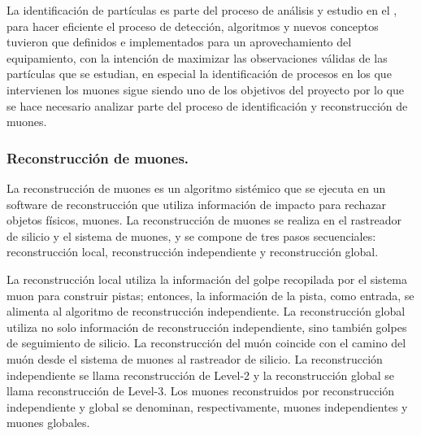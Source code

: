 La identificación de partículas es parte del proceso de análisis y estudio en el \LHC, para hacer eficiente el proceso de detección, algoritmos y nuevos conceptos tuvieron que definidos e implementados para un aprovechamiento del equipamiento, con la intención de maximizar las observaciones válidas de las partículas que se estudian, en especial la identificación de procesos en los que intervienen los muones sigue siendo uno de los objetivos del proyecto por lo que se hace necesario analizar parte del proceso de identificación y reconstrucción de muones.

\subsubsection{Reconstrucción de muones.}
La reconstrucción de muones es un algoritmo sistémico que se ejecuta en un software de reconstrucción que utiliza información de impacto para rechazar objetos físicos, muones. La reconstrucción de muones se realiza en el rastreador de silicio y el sistema de muones, y se compone de tres pasos secuenciales: reconstrucción local, reconstrucción independiente y reconstrucción global. 

La reconstrucción local utiliza la información del golpe recopilada por el sistema muon para construir pistas; entonces, la información de la pista, como entrada, se alimenta al algoritmo de reconstrucción independiente. La reconstrucción global utiliza no solo información de reconstrucción independiente, sino también golpes de seguimiento de silicio. La reconstrucción del muón coincide con el camino del muón desde el sistema de muones al rastreador de silicio. La reconstrucción independiente se llama reconstrucción de Level-2 y la reconstrucción global se llama reconstrucción de Level-3. Los muones reconstruidos por reconstrucción independiente y global se denominan, respectivamente, muones independientes y muones globales.

